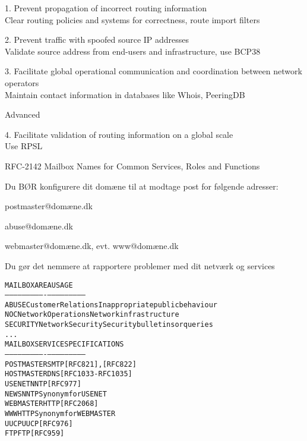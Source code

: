 \documentclass[Screen16to9,17pt]{foils}
\begin{document}
\begin{list1}
\item 1. Prevent propagation of incorrect routing information\\
Clear routing policies and systems for correctness, route import filters
\item 2. Prevent traffic with spoofed source IP addresses\\
Validate source address from end-users and infrastructure, use BCP38
\item 3. Facilitate global operational communication and coordination between network operators\\
Maintain contact information in databases like Whois, PeeringDB
{\small{}}

\item Advanced
\item 4. Facilitate validation of routing information on a global scale\\
Use RPSL {\small{}}
\end{list1}


\begin{list1}
\item RFC-2142 Mailbox Names for Common Services, Roles and Functions
\item Du BØR konfigurere dit domæne til at modtage post for følgende adresser:
\begin{list2}
\item postmaster@domæne.dk
\item abuse@domæne.dk
\item webmaster@domæne.dk, evt. www@domæne.dk
\end{list2}
\item Du gør det nemmere at rapportere problemer med dit netværk og services
\end{list1}


\begin{alltt}\small
MAILBOX       AREA                USAGE
-----------   ----------------    ---------------------------
ABUSE         Customer Relations  Inappropriate public behaviour
NOC           Network Operations  Network infrastructure
SECURITY      Network Security    Security bulletins or queries
...
MAILBOX       SERVICE             SPECIFICATIONS
-----------   ----------------    ---------------------------
POSTMASTER    SMTP                [RFC821], [RFC822]
HOSTMASTER    DNS                 [RFC1033-RFC1035]
USENET        NNTP                [RFC977]
NEWS          NNTP                Synonym for USENET
WEBMASTER     HTTP                [RFC 2068]
WWW           HTTP                Synonym for WEBMASTER
UUCP          UUCP                [RFC976]
FTP           FTP                 [RFC959]
\end{alltt}
\end{document}
